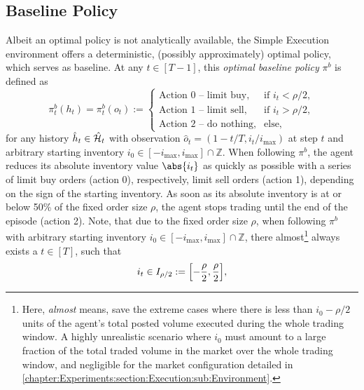 \documentclass[
    a4paper,
    11pt,
    bibliography=totoc,
    listof=totoc,      
    headinclude=true,
    cleardoublepage=empty,
]{scrbook}
\theoremstyle{plain}
\theoremstyle{definition}
\theoremstyle{remark}
\newcommand{\SetZ}{\mathbb Z}
\newcommand{\SpaceH}{{\cal H}}
\begin{document}
\subsection{Baseline Policy}
\label{chapter:Experiments:section:Execution:sub:BaselinePolicy}

Albeit an optimal policy is not analytically available, the Simple Execution 
environment offers a deterministic, (possibly approximately) optimal policy, 
which serves as baseline. At any $t\in[T-1]$, this \textit{optimal 
baseline policy} $\pi^b$ is defined as
\begin{equation}
\label{eq:ExecutionBaselinePolicy}
    \pi_t^b(h_t) = \pi^b_t(o_t)
    := \begin{cases}
        \text{Action 0 – limit buy},  & \text{if } i_t < \rho/2, \\
        \text{Action 1 – limit sell}, & \text{if } i_t > \rho/2, \\
        \text{Action 2 – do nothing}, & \text{else,}
    \end{cases}
\end{equation}
for any history $\hat{h}_t \in \hat{\SpaceH}_t$ with observation $\hat o_t = 
(1-t/T, i_t/i_{\max})$ at step $t$ and arbitrary starting inventory $i_0 \in
[-i_{\max}, i_{\max}]\cap\SetZ$. When following $\pi^b$, the agent reduces its 
absolute inventory value $\abs{i_t}$ as quickly as possible with a series of 
limit buy orders (action 0), respectively, limit sell orders (action 1), 
depending on the sign of the starting inventory. As soon as its absolute 
inventory is at or below 50\% of the fixed order size $\rho$, the agent stops 
trading until the end of the episode (action 2). Note, that due to the fixed 
order size $\rho$, when following $\pi^b$ with arbitrary starting inventory 
$i_0\in[-i_{\max}, i_{\max}]\cap\SetZ$, there almost\footnote{
    Here, \textit{almost} means, save the extreme cases where there is less 
    than $i_0 - \rho/2$ units of the agent's total posted volume executed 
    during the whole trading window. A highly unrealistic scenario where $i_0$ 
    must amount to a large fraction of the total traded volume in the market 
    over the whole trading window, and negligible for the market configuration 
    detailed in 
    \cref{chapter:Experiments:section:Execution:sub:Environment}.
} always exists a $t\in[T]$, such that 
\[
    i_t \in I_{\rho/2} := \Bigl[-\frac{\rho}{2}, \frac{\rho}{2}\Bigr],
\]
\end{document}
